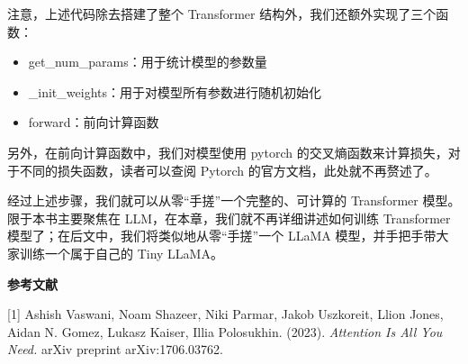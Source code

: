 \documentclass[12pt,a4paper]{book}
\begin{document}
\begin{Shaded}
\begin{Highlighting}[]
          \NormalTok{:}
\OperatorTok{=} 
\OperatorTok{=}\OperatorTok{{-}}\OperatorTok{{-}}\OperatorTok{{-}}\OperatorTok{={-}}\NormalTok{)}
        \NormalTok{:}
\OperatorTok{=} \NormalTok{.lm\_head(x[:, [}\OperatorTok{{-}}\NormalTok{], :]) }
\OperatorTok{=} 

\end{Highlighting}
\end{Shaded}

注意，上述代码除去搭建了整个 Transformer
结构外，我们还额外实现了三个函数：

\begin{itemize}
\tightlist
\item
  get\_num\_params：用于统计模型的参数量
\item
  \_init\_weights：用于对模型所有参数进行随机初始化
\item
  forward：前向计算函数
\end{itemize}

另外，在前向计算函数中，我们对模型使用 pytorch
的交叉熵函数来计算损失，对于不同的损失函数，读者可以查阅 Pytorch
的官方文档，此处就不再赘述了。

经过上述步骤，我们就可以从零``手搓''一个完整的、可计算的 Transformer
模型。限于本书主要聚焦在 LLM，在本章，我们就不再详细讲述如何训练
Transformer 模型了；在后文中，我们将类似地从零``手搓''一个 LLaMA
模型，并手把手带大家训练一个属于自己的 Tiny LLaMA。

\textbf{参考文献}

{[}1{]} Ashish Vaswani, Noam Shazeer, Niki Parmar, Jakob Uszkoreit,
Llion Jones, Aidan N. Gomez, Lukasz Kaiser, Illia Polosukhin. (2023).
\emph{Attention Is All You Need.} arXiv preprint arXiv:1706.03762.
\end{document}
